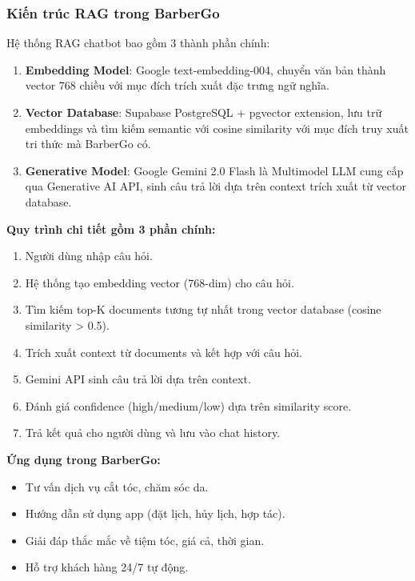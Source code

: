 \subsubsection{Kiến trúc RAG trong BarberGo}

Hệ thống RAG chatbot bao gồm 3 thành phần chính:

\begin{enumerate}
    \item \textbf{Embedding Model}: Google text-embedding-004, chuyển văn bản thành vector 768 chiều với mục đích trích xuất đặc trưng ngữ nghĩa.

    \item \textbf{Vector Database}: Supabase PostgreSQL + pgvector extension, lưu trữ embeddings và tìm kiếm semantic với cosine similarity với mục đích truy xuất tri thức mà BarberGo có.

    \item \textbf{Generative Model}: Google Gemini 2.0 Flash là Multimodel LLM cung cấp qua Generative AI API, sinh câu trả lời dựa trên context trích xuất từ vector database.
\end{enumerate}

\textbf{Quy trình chi tiết gồm 3 phần chính:}
\begin{enumerate}
    \item Người dùng nhập câu hỏi.
    \item Hệ thống tạo embedding vector (768-dim) cho câu hỏi.
    \item Tìm kiếm top-K documents tương tự nhất trong vector database (cosine similarity > 0.5).
    \item Trích xuất context từ documents và kết hợp với câu hỏi.
    \item Gemini API sinh câu trả lời dựa trên context.
    \item Đánh giá confidence (high/medium/low) dựa trên similarity score.
    \item Trả kết quả cho người dùng và lưu vào chat history.
\end{enumerate}
\textbf{Ứng dụng trong BarberGo:}
\begin{itemize}
    \item Tư vấn dịch vụ cắt tóc, chăm sóc da.
    \item Hướng dẫn sử dụng app (đặt lịch, hủy lịch, hợp tác).
    \item Giải đáp thắc mắc về tiệm tóc, giá cả, thời gian.
    \item Hỗ trợ khách hàng 24/7 tự động.
\end{itemize}


